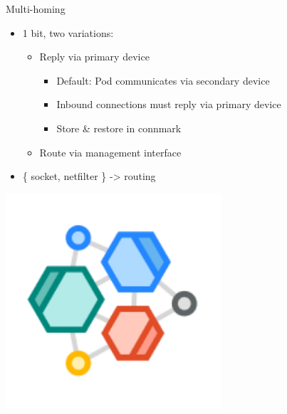 \documentclass[black,white,aspectratio=169]{beamer}
\DeclareRobustCommand{\#}{\adjustbox{valign=B,totalheight=.57\baselineskip}{\oldhash}}%
\newcommand\todo[1]{
    \textcolor{red}{#1}
}
\begin{document}
    \begin{frame}{Multi-homing}
        \begin{table}
            \begin{subtable}[l]{0.7\textwidth}
        \begin{itemize}
            \item 1 bit, two variations:~\smallskip
            \begin{itemize}
                \item Reply via primary device~\smallskip
                \begin{itemize}
                    \item Default: Pod communicates via secondary device~\smallskip
                    \item Inbound connections must reply via primary device~\smallskip
                    \item Store \& restore in connmark~\medskip
                \end{itemize}
                \item Route via management interface~\medskip
            \end{itemize}
            \item \{ socket, netfilter \} -> routing~\medskip
        \end{itemize}
            \end{subtable}
            \begin{subtable}[r]{0.2\textwidth}
                \includegraphics[width=0.6\textwidth]{clustermesh.png}
            \end{subtable}
        \end{table}
    \end{frame}
\end{document}

